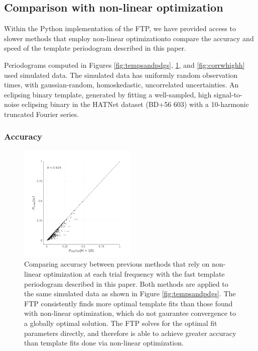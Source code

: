 \documentclass[apj]{emulateapj}
\begin{document}
\subsection{Comparison with non-linear optimization}

Within the Python implementation of the FTP, we have provided access to slower 
methods that employ non-linear optimizationto compare the accuracy and speed 
of the template periodogram described in this paper.

Periodograms computed in Figures \ref{fig:tempsandpdgs}, \ref{fig:corrwgats},
and \ref{fig:corrwhighh} used simulated data. The simulated data has uniformly
random observation times, with gaussian-random, homoskedastic, uncorrelated 
uncertainties. An eclipsing binary template, generated by fitting a well-sampled,
high signal-to-noise eclipsing binary in the HATNet dataset (BD+56 603)
with a 10-harmonic truncated Fourier series.

\subsubsection{Accuracy}

\begin{figure}
    \centering
    \includegraphics[width=0.5\textwidth]{plots/correlation_with_nonlinopt.pdf}
    \caption{\label{fig:corrwgats} Comparing accuracy between previous methods that rely
            on non-linear optimization at each trial frequency with the fast template periodogram 
            described in this paper. Both methods are applied to the same simulated data as shown 
            in Figure \ref{fig:tempsandpdgs}.
            The FTP consistently finds more optimal template fits than 
            those found with non-linear optimization, which do not gaurantee convergence to 
            a globally optimal solution. The FTP solves for the optimal
            fit parameters directly, and therefore is able to achieve greater accuracy than template
            fits done via non-linear optimization.}
\end{figure}
\end{document}
